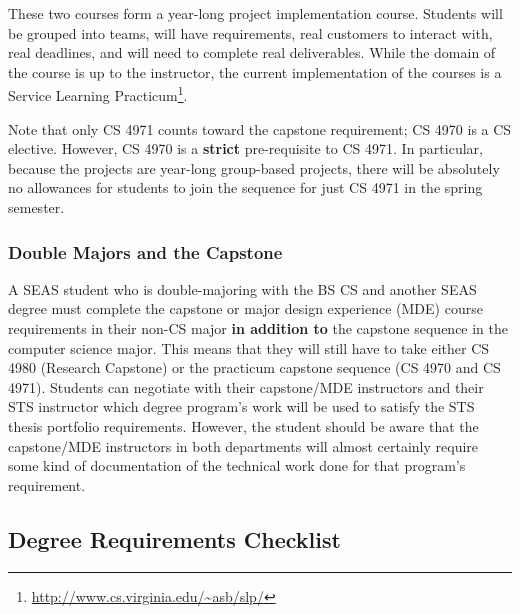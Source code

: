 \documentclass[10pt,letter]{book}
\newcommand{\myurl}[1]{\footnote{\scriptsize\url{#1}}}
\begin{document}
These two courses form a year-long project implementation course.
Students will be grouped into teams, will have requirements, real
customers to interact with, real deadlines, and will need to complete
real deliverables.  While the domain of the course is up to the
instructor, the current implementation of the courses is a Service
Learning Practicum\myurl{http://www.cs.virginia.edu/~asb/slp/}.

Note that only CS 4971 counts toward the capstone requirement; CS 4970
is a CS elective.  However, CS 4970 is a {\bf strict} pre-requisite to
CS 4971.  In particular, because the projects are year-long
group-based projects, there will be absolutely no allowances for
students to join the sequence for just CS 4971 in the spring semester.


\subsubsection{Double Majors and the Capstone}

A SEAS student who is double-majoring with the BS CS and another SEAS
degree must complete the capstone or major design experience (MDE)
course requirements in their non-CS major {\bf in addition to} the
capstone sequence in the computer science major.  This means that they
will still have to take either CS 4980 (Research Capstone) or the
practicum capstone sequence (CS 4970 and CS 4971). Students can
negotiate with their capstone/MDE instructors and their STS instructor
which degree program's work will be used to satisfy the STS thesis
portfolio requirements. However, the student should be aware that the
capstone/MDE instructors in both departments will almost certainly
require some kind of documentation of the technical work done for that
program's requirement.



\clearpage
\subsection{Degree Requirements Checklist}
\end{document}
